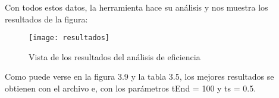 Con todos estos datos, la herramienta hace su análisis y nos muestra los resultados de la figura:

\begin{figure}[H]
\centering
\texttt{[image: resultados]}
\caption{Vista de los resultados del análisis de eficiencia}
\end{figure}

Como puede verse en la figura 3.9 y la tabla 3.5, los mejores resultados se obtienen con el archivo e, con los parámetros tEnd = 100 y ts = 0.5.